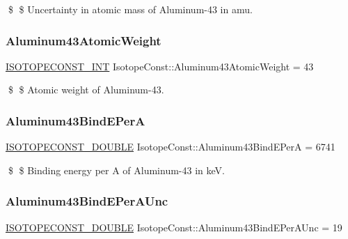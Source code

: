 \$ \$ Uncertainty in atomic mass of Aluminum-\/43 in amu. \mbox{\label{group___isotope_const-_aluminum-_al43_gaddbde51b3b50c975e01853e99abd9b23}} 
\subsubsection{\texorpdfstring{Aluminum43\+Atomic\+Weight}{Aluminum43AtomicWeight}}
{\footnotesize\ttfamily \mbox{\hyperlink{group___isotope_const-_macros_ga5f18360b3e99483a35c32d789e62621c}{I\+S\+O\+T\+O\+P\+E\+C\+O\+N\+S\+T\+\_\+\+I\+NT}} Isotope\+Const\+::\+Aluminum43\+Atomic\+Weight = 43}

\$ \$ Atomic weight of Aluminum-\/43. \mbox{\label{group___isotope_const-_aluminum-_al43_gaef452ad6a92808041ae0b2121fc1b483}} 
\subsubsection{\texorpdfstring{Aluminum43\+Bind\+E\+PerA}{Aluminum43BindEPerA}}
{\footnotesize\ttfamily \mbox{\hyperlink{group___isotope_const-_macros_ga8f45a7272ce02c0b4c65c44636ed719a}{I\+S\+O\+T\+O\+P\+E\+C\+O\+N\+S\+T\+\_\+\+D\+O\+U\+B\+LE}} Isotope\+Const\+::\+Aluminum43\+Bind\+E\+PerA = 6741}

\$ \$ Binding energy per A of Aluminum-\/43 in keV. \mbox{\label{group___isotope_const-_aluminum-_al43_ga347225b8c1e1c52f15e5299ab2001da5}} 
\subsubsection{\texorpdfstring{Aluminum43\+Bind\+E\+Per\+A\+Unc}{Aluminum43BindEPerAUnc}}
{\footnotesize\ttfamily \mbox{\hyperlink{group___isotope_const-_macros_ga8f45a7272ce02c0b4c65c44636ed719a}{I\+S\+O\+T\+O\+P\+E\+C\+O\+N\+S\+T\+\_\+\+D\+O\+U\+B\+LE}} Isotope\+Const\+::\+Aluminum43\+Bind\+E\+Per\+A\+Unc = 19}

